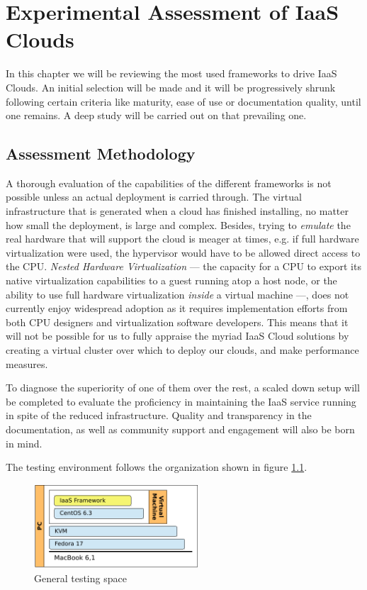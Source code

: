 \chapter{Experimental Assessment of IaaS Clouds}\label{cap:evaliaas}

\noindent In this chapter we will be reviewing the most used frameworks to drive IaaS Clouds. An initial selection will be made and it will be progressively shrunk following certain criteria like maturity, ease of use or documentation quality, until one remains. A deep study will be carried out on that prevailing one.

\section{Assessment Methodology}\label{sec:evaluacion}

\noindent A thorough evaluation of the capabilities of the different frameworks is not possible unless an actual deployment is carried through. The virtual infrastructure that is generated when a cloud has finished installing, no matter how small the deployment, is large and complex. Besides, trying to \emph{emulate} the real hardware that will support the cloud is meager at times, e.g. if full hardware virtualization were used, the hypervisor would have to be allowed direct access to the CPU. \emph{Nested Hardware Virtualization} --- the capacity for a CPU to export its native virtualization capabilities to a guest running atop a host node, or the ability to use full hardware virtualization \emph{inside} a virtual machine ---, does not currently enjoy widespread adoption as it requires implementation efforts from both CPU designers and virtualization software developers. This means that it will not be possible for us to fully appraise the myriad IaaS Cloud solutions by creating a virtual cluster over which to deploy our clouds, and make performance measures.

To diagnose the superiority of one of them over the rest, a scaled down setup will be completed to evaluate the proficiency in maintaining the IaaS service running in spite of the reduced infrastructure. Quality and transparency in the documentation, as well as community support and engagement will also be born in mind.

The testing environment follows the organization shown in figure \ref{fig:espacioprueba}.

\begin{figure}[tbp]
\begin{center}
\includegraphics[width=0.55\textwidth]{imagenes/007.pdf}
 \caption{General testing space}
\label{fig:espacioprueba}
\end{center}
\end{figure}

